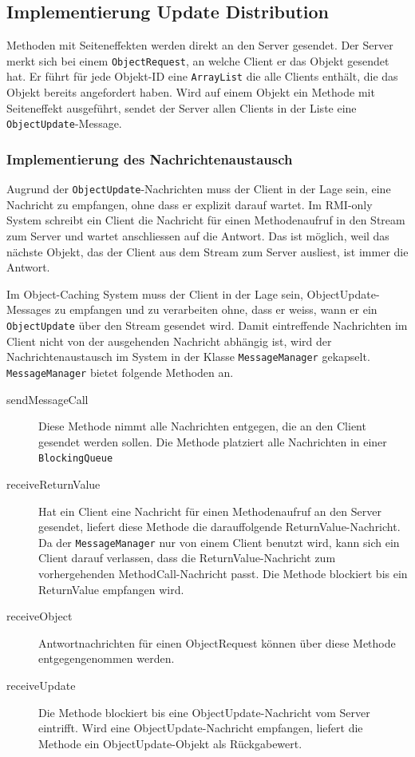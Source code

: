 \subsection{Implementierung Update Distribution}
\label{sec:impl-update-distr}

Methoden mit Seiteneffekten werden direkt an den Server gesendet. Der Server merkt sich bei einem \verb|ObjectRequest|, an welche Client er das Objekt gesendet hat. Er führt für jede Objekt-ID eine \verb|ArrayList| die alle Clients enthält, die das Objekt bereits angefordert haben. Wird auf einem Objekt ein Methode mit Seiteneffekt ausgeführt, sendet der Server allen Clients in der Liste eine \verb|ObjectUpdate|-Message.

\subsubsection{Implementierung des Nachrichtenaustausch}
\label{sec:impl-des-nachr}

Augrund der \verb|ObjectUpdate|-Nachrichten muss der Client in der Lage sein, eine Nachricht zu empfangen, ohne dass er explizit darauf wartet. Im RMI-only System schreibt ein Client die Nachricht für einen Methodenaufruf in den Stream zum Server und wartet anschliessen auf die Antwort. Das ist möglich, weil das nächste Objekt, das der Client aus dem Stream zum Server ausliest, ist immer die Antwort.

Im Object-Caching System muss der Client in der Lage sein, Object\-Update\--Messages zu empfangen und zu verarbeiten ohne, dass er weiss, wann er ein \verb|ObjectUpdate| über den Stream gesendet wird. Damit eintreffende Nach\-richten im Client nicht von der ausgehenden Nachricht abhängig ist, wird der Nach\-richt\-enaustausch im System in der Klasse \verb|MessageManager| gekapselt. \newline \verb|MessageManager| bietet folgende Methoden an.

\begin{description}
\item[sendMessageCall] Diese Methode nimmt alle Nachrichten entgegen, die an den Client gesendet werden sollen. Die Methode platziert alle Nachrichten in einer \verb|BlockingQueue| 
\item[receiveReturnValue] Hat ein Client eine Nachricht für einen Methodenaufruf an den Server gesendet, liefert diese Methode die darauffolgende ReturnValue-Nachricht. Da der \verb+MessageManager+ nur von einem Client benutzt wird, kann sich ein Client darauf verlassen, dass die ReturnValue-Nachricht zum vorhergehenden MethodCall-Nach\-richt \-passt.  Die Methode blockiert bis ein ReturnValue empfangen wird.
\item[receiveObject] Antwortnachrichten für einen ObjectRequest können über diese Methode entgegengenommen werden. 
\item[receiveUpdate] Die Methode blockiert bis eine ObjectUpdate-Nachricht vom Server eintrifft. Wird eine ObjectUpdate-Nachricht empfangen, liefert die Methode ein ObjectUpdate-Objekt als Rückgabewert.
\end{description}

